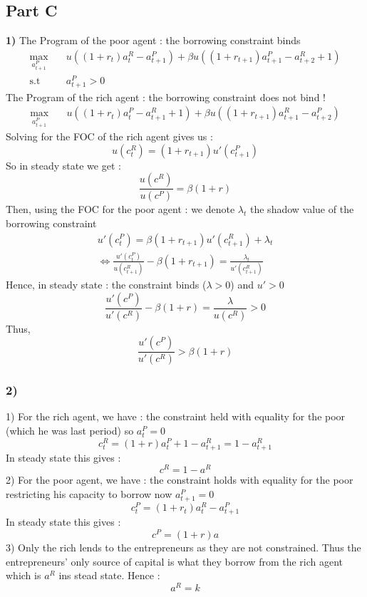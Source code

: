 \documentclass{article}
\begin{document}
\subsection{Part C}
\textbf{1)}
The Program of the poor agent : the borrowing constraint binds 
$$\begin{aligned}
    \max_{a_{t+1}^P} &\quad u((1+r_t)a_t^R-a_{t+1}^P)+\beta u((1+r_{t+1})a_{t+1}^P-a_{t+2}^R+1)\\
    \text{s.t} &\quad a_{t+1}^P > 0
\end{aligned}$$
The Program of the rich agent : the borrowing constraint does not  bind !
$$\begin{aligned}
    \max_{a_{t+1}^P} &\quad u((1+r_t)a_t^P-a_{t+1}^R+1)+\beta u((1+r_{t+1})a_{t+1}^R-a_{t+2}^P)
\end{aligned}$$
Solving for the FOC of the rich agent gives us : 
$$u(c_t^R)=(1+r_{t+1})u'(c_{t+1}^P)$$
So in steady state we get : 
$$\frac{u(c^R)}{u(c^P)}=\beta (1+r)$$
Then, using the FOC for the poor agent : we denote $\lambda_t$ the shadow value of the borrowing constraint
$$\begin{aligned}
    u'(c_t^P)=\beta(1+r_{t+1})u'(c_{t+1}^R)+\lambda_t\\
    \Leftrightarrow \frac{u'(c_t^P)}{u(c_{t+1}^R)}-\beta (1+r_{t+1})=\frac{\lambda_t}{u'(c_{t+1}^R)}
\end{aligned}$$
Hence, in steady state : the constraint binds ($\lambda >0$) and $u'>0$
$$\frac{u'(c^P)}{u'(c^R)}-\beta (1+r) = \frac{\lambda}{u(c^R)}>0$$
Thus, 
$$\frac{u'(c^P)}{u'(c^R)} > \beta (1+r)$$

\subsubsection{2)}
1) For the rich agent, we have : the constraint held with equality for the poor (which he was last period) so $a_t^P=0$
$$c_t^R = (1+r)a_t^P+1-a_{t+1}^R=1-a_{t+1}^R$$
In steady state this gives : 
$$c^R=1-a^R$$
2) For the poor agent, we have : the constraint holds with equality for the poor restricting his capacity to borrow now $a_{t+1}^P=0$
$$c_t^P=(1+r_t)a_t^R-a_{t+1}^P$$
In steady state this gives : 
$$c^P = (1+r)a$$
3) Only the rich lends to the entrepreneurs as they are not constrained. Thus the entrepreneurs' only source of capital is what they borrow from the rich agent which is $a^R$ ins stead state. Hence : 
$$a^R=k$$
\end{document}
